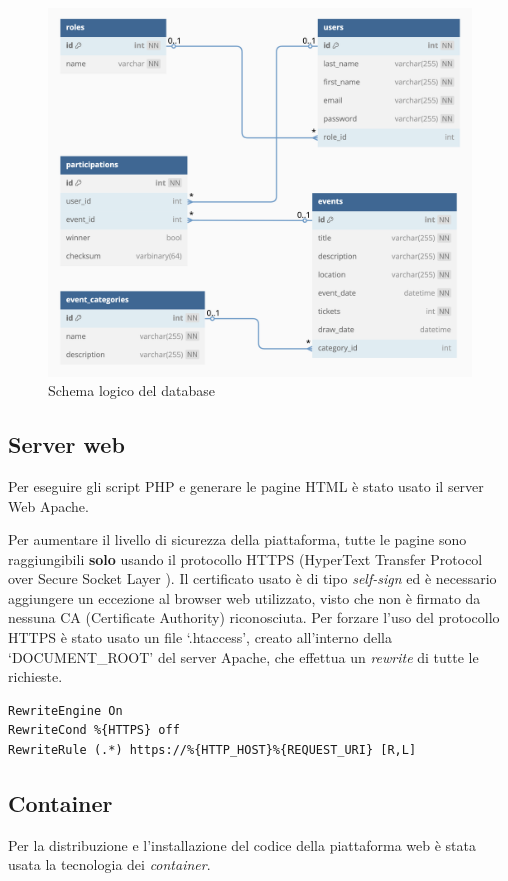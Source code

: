 \documentclass[italian,12pt,a4paper,oneside,final]{report}
\begin{document}
\begin{figure}[!h]
	\centerline{\includegraphics[scale=0.6]{schema_db.png}}
	\caption{Schema logico del database}
	\label{fig:schema_db}
\end{figure}

\subsection{Server web}
Per eseguire gli script PHP e generare le pagine HTML è stato usato il server Web Apache.

Per aumentare il livello di sicurezza della piattaforma, tutte le pagine sono raggiungibili \textbf{solo} usando il protocollo HTTPS (HyperText Transfer Protocol over Secure Socket Layer ).
Il certificato usato è di tipo \textit{self-sign} ed è necessario aggiungere un eccezione al browser web utilizzato, visto che non è firmato da nessuna CA (Certificate Authority) riconosciuta.
Per forzare l'uso del protocollo HTTPS è stato usato un file `.htaccess', creato all'interno della `DOCUMENT\_ROOT' del server Apache, che effettua un \textit{rewrite} di tutte le richieste.
\hfill \break
\begin{lstlisting}[caption=File .htaccess]
RewriteEngine On
RewriteCond %{HTTPS} off
RewriteRule (.*) https://%{HTTP_HOST}%{REQUEST_URI} [R,L]
\end{lstlisting}

\subsection{Container}
Per la distribuzione e l'installazione del codice della piattaforma web è stata usata la tecnologia dei \textit{container}.
\end{document}
